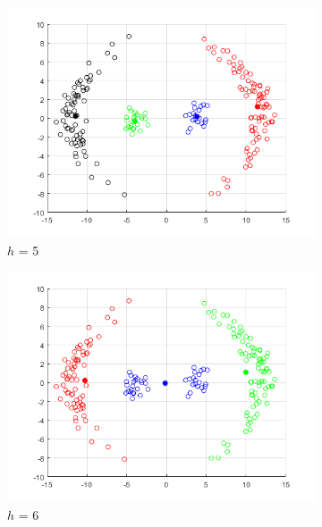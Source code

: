 \documentclass[12pt]{article}
\begin{document}
\begin{figure}[H]
\medskip
\begin{subfigure}{0.25\textwidth}
  \includegraphics[width=\linewidth]{figs/1-b-meanshift-c.png}
  \caption{$h$ = 5}
  \label{fig:4}
\end{subfigure}\hfil %
\begin{subfigure}{0.25\textwidth}
  \includegraphics[width=\linewidth]{figs/1-b-meanshift-c-6.png}
  \caption{$h$ = 6}
  \label{fig:5}
\end{subfigure}\hfil %
\begin{subfigure}{0.25\textwidth}

\end{subfigure}
\end{figure}
\end{document}
